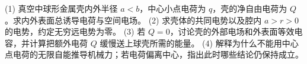 (1) 真空中球形金属壳内外半径 \(a<b\)，中心小点电荷为 \(q\)，壳的净自由电荷为 \(Q\)。求内外表面总诱导电荷与空间电场。
(2) 求壳体的共同电势以及腔内 \(a>r>0\) 的电势，约定无穷远电势为零。
(3) 若 \(Q=0\)，讨论壳的外部电场和外表面等效电容，并计算把额外电荷 \(Q\) 缓慢送上球壳所需的能量。
(4) 解释为什么不能用中心点电荷的无限自能推导机械力；若电荷偏离中心，指出此时哪些结论仍保持成立。
